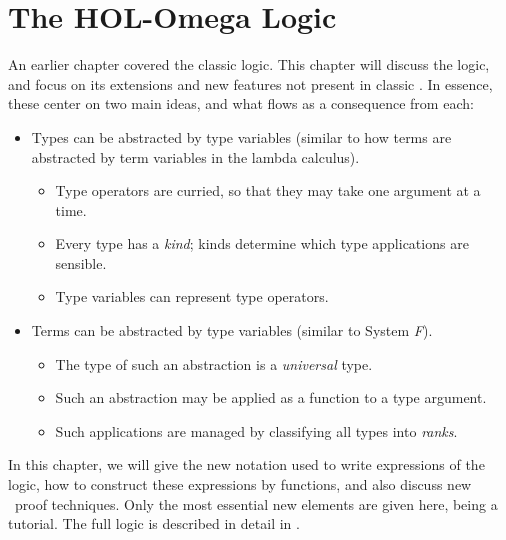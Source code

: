 \chapter{The HOL-Omega Logic}\label{chap:HOLWlogic}

An earlier chapter covered the classic \HOL{} logic.
This chapter will discuss the \HOLW{} logic, 
and focus on its
extensions and new features not present in classic \HOL.
In essence, these center on
two main ideas, and what flows as a consequence from each:

\begin{itemize}
\item Types can be abstracted by type variables
(similar to how terms are abstracted by term variables in the lambda calculus).
 \begin{itemize}
 \item Type operators are curried,
       so that they may take one argument at a time.
 \item Every type has a {\it kind}; kinds determine which
       type applications are sensible.
 \item Type variables can represent type operators.
 \end{itemize}
\item Terms can be abstracted by type variables
(similar to System {\it F}).
 \begin{itemize}
 \item The type of such an abstraction is a {\it universal\/} type.
 \item Such an abstraction may be applied
       as a function to a type argument.
 \item Such applications are managed
       by classifying all types into {\it ranks}.
 \end{itemize}
\end{itemize}

In this chapter, we will give the new notation used to write expressions
of the \HOLW{} logic, how to construct these expressions by \ML{} functions,
and also discuss new \HOLW\ proof techniques.
Only the most essential new elements are given here, being a tutorial.
The full logic
is described in detail in \DESCRIPTION.


